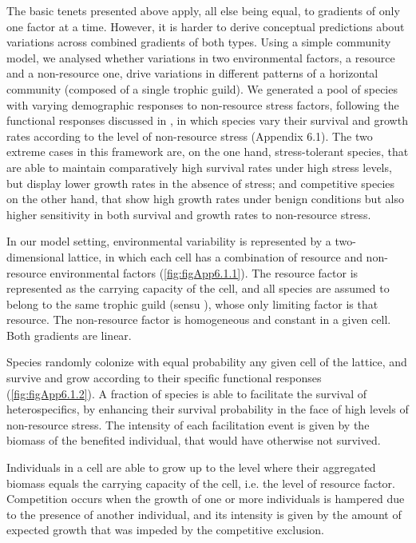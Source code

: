 The basic tenets presented above apply, all else being equal, to gradients of only one factor at a time. However, it is harder to derive conceptual predictions about variations across combined gradients of both types. Using a simple community model, we analysed whether variations in two environmental factors, a resource and a non-resource one, drive variations in different patterns of a horizontal community (composed of a single trophic guild). We generated a pool of species with varying demographic responses to non-resource stress factors, following the functional responses discussed in \cite{Maestre2009}, in which species vary their survival and growth rates according to the level of non-resource stress (Appendix 6.1). The two extreme cases in this framework are, on the one hand, stress-tolerant species, that are able to maintain comparatively high survival rates under high stress levels, but display lower growth rates in the absence of stress; and competitive species on the other hand, that show high growth rates under benign conditions but also higher sensitivity in both survival and growth rates to non-resource stress.

In our model setting, environmental variability is represented by a two-dimensional lattice, in which each cell has a combination of resource and non-resource environmental factors (\cref{fig:figApp6.1.1}). The resource factor is represented as the carrying capacity of the cell, and all species are assumed to belong to the same trophic guild (sensu \citealt{Fauth1996}), whose only limiting factor is that resource. The non-resource factor is homogeneous and constant in a given cell. Both gradients are linear.

Species randomly colonize with equal probability any given cell of the lattice, and survive and grow according to their specific functional responses (\cref{fig:figApp6.1.2}). A fraction of species is able to facilitate the survival of heterospecifics, by enhancing their survival probability in the face of high levels of non-resource stress. The intensity of each facilitation event is given by the biomass of the benefited individual, that would have otherwise not survived.

Individuals in a cell are able to grow up to the level where their aggregated biomass equals the carrying capacity of the cell, i.e. the level of resource factor. Competition occurs when the growth of one or more individuals is hampered due to the presence of another individual, and its intensity is given by the amount of expected growth that was impeded by the competitive exclusion.

